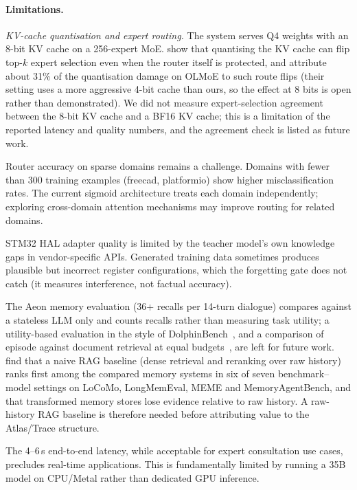 \documentclass[11pt,a4paper]{article}
\begin{document}
\paragraph{Limitations.}

\emph{KV-cache quantisation and expert routing.} The system serves Q4 weights with an 8-bit KV cache on a 256-expert MoE. \citet{gu2026routeflip} show that quantising the KV cache can flip top-$k$ expert selection even when the router itself is protected, and attribute about 31\% of the quantisation damage on OLMoE to such route flips (their setting uses a more aggressive 4-bit cache than ours, so the effect at 8 bits is open rather than demonstrated). We did not measure expert-selection agreement between the 8-bit KV cache and a BF16 KV cache; this is a limitation of the reported latency and quality numbers, and the agreement check is listed as future work.

Router accuracy on sparse domains remains a challenge. Domains with fewer than 300 training examples (freecad, platformio) show higher misclassification rates. The current sigmoid architecture treats each domain independently; exploring cross-domain attention mechanisms may improve routing for related domains.

STM32 HAL adapter quality is limited by the teacher model's own knowledge gaps in vendor-specific APIs. Generated training data sometimes produces plausible but incorrect register configurations, which the forgetting gate does not catch (it measures interference, not factual accuracy).

The Aeon memory evaluation (36+ recalls per 14-turn dialogue) compares against a stateless LLM only and counts recalls rather than measuring task utility; a utility-based evaluation in the style of DolphinBench~\citep{rathi2026dolphinbench}, and a comparison of episode against document retrieval at equal budgets~\citep{xu2026episodic}, are left for future work. \citet{bao2026naiverag} find that a naive RAG baseline (dense retrieval and reranking over raw history) ranks first among the compared memory systems in six of seven benchmark--model settings on LoCoMo, LongMemEval, MEME and MemoryAgentBench, and that transformed memory stores lose evidence relative to raw history. A raw-history RAG baseline is therefore needed before attributing value to the Atlas/Trace structure.

The 4--6\,s end-to-end latency, while acceptable for expert consultation use cases, precludes real-time applications. This is fundamentally limited by running a 35B model on CPU/Metal rather than dedicated GPU inference.
\end{document}
